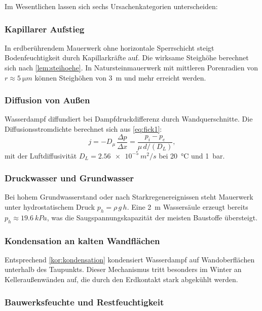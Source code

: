 ﻿\documentclass[a4paper,12pt]{article}
\theoremstyle{definition}
\begin{document}
Im Wesentlichen lassen sich sechs Ursachenkategorien unterscheiden:

\subsubsection{Kapillarer Aufstieg}

In erdber\"uhrendem Mauerwerk ohne horizontale Sperrschicht steigt
Bodenfeuchtigkeit durch Kapillarkr\"afte auf. Die wirksame Steigh\"ohe
berechnet sich nach \cref{lem:steihoehe}. In Natursteinmauerwerk
mit mittleren Porenradien von $r \approx \SI{5}{\micro m}$ k\"onnen
Steigh\"ohen von \SI{3}{m} und mehr erreicht werden.

\subsubsection{Diffusion von Au\ss{}en}

Wasserdampf diffundiert bei Dampfdruckdifferenz durch Wandquerschnitte.
Die Diffusionsstromdichte berechnet sich aus \cref{eq:fick1}:
\begin{equation}
  j = -D_{\mu}\,\frac{\Delta p}{\Delta x}
    = \frac{p_i - p_e}{\mu\,d/(D_L)},
\end{equation}
mit der Luftdiffusivit\"at $D_L = \SI{2.56e-5}{m^2/s}$ bei
\SI{20}{\celsius} und \SI{1}{bar}.

\subsubsection{Druckwasser und Grundwasser}

Bei hohem Grundwasserstand oder nach Starkregenereignissen steht
Mauerwerk unter hydrostatischem Druck $p_h = \rho\,g\,h$. Eine
\SI{2}{m} Wassers\"aule erzeugt bereits $p_h \approx \SI{19.6}{kPa}$,
was die Saugspannungskapazit\"at der meisten Baustoffe \"ubersteigt.

\subsubsection{Kondensation an kalten Wandfl\"achen}

Entsprechend \cref{kor:kondensation} kondensiert Wasserdampf auf
Wandoberfl\"achen unterhalb des Taupunkts. Dieser Mechanismus tritt
besonders im Winter an Kellerau\ss{}enw\"anden auf, die durch den
Erdkontakt stark abgek\"uhlt werden.

\subsubsection{Bauwerksfeuchte und Restfeuchtigkeit}
\end{document}
